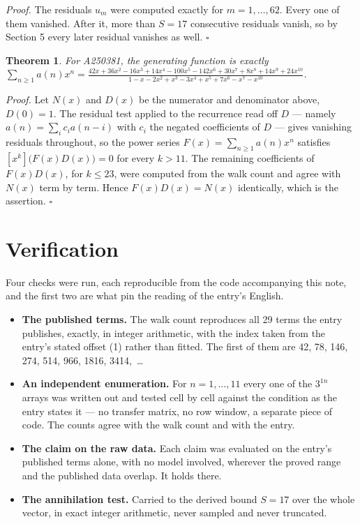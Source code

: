 \documentclass[11pt]{article}
\newtheorem{theorem}{Theorem}
\theoremstyle{definition}
\begin{document}
{\itshape Proof.} The residuals $u_m$ were computed exactly for $m = 1,\dots,62$. Every one of them vanished. After it, more than $S = 17$ consecutive residuals vanish, so by Section 5 every later residual vanishes as well. $\square$

\begin{theorem} For A250381, the generating function is exactly $\sum_{n\ge 1} a(n)x^n = \frac{42x + 36x^{2} - 16x^{3} + 14x^{4} - 100x^{5} - 142x^{6} + 30x^{7} + 8x^{8} + 14x^{9} + 24x^{10}}{1 - x - 2x^{2} + x^{3} - 3x^{4} + x^{5} + 7x^{6} - x^{7} - x^{10}}$.\end{theorem}

{\itshape Proof.} Let $N(x)$ and $D(x)$ be the numerator and denominator above, $D(0)=1$. The residual test applied to the recurrence read off $D$ --- namely $a(n) = \sum_i c_i a(n-i)$ with $c_i$ the negated coefficients of $D$ --- gives vanishing residuals throughout, so the power series $F(x)=\sum_{n\ge 1}a(n)x^n$ satisfies $[x^k]\bigl(F(x)D(x)\bigr) = 0$ for every $k > 11$. The remaining coefficients of $F(x)D(x)$, for $k \le 23$, were computed from the walk count and agree with $N(x)$ term by term. Hence $F(x)D(x) = N(x)$ identically, which is the assertion. $\square$

\section{Verification}

Four checks were run, each reproducible from the code accompanying this note, and the first two are what pin the reading of the entry's English.

\begin{itemize}

\item {\bfseries The published terms.} The walk count reproduces all 29 terms the entry publishes, exactly, in integer arithmetic, with the index taken from the entry's stated offset (1) rather than fitted. The first of them are 42, 78, 146, 274, 514, 966, 1816, 3414,~\dots

\item {\bfseries An independent enumeration.} For $n = 1,\dots,11$ every one of the $3^{1n}$ arrays was written out and tested cell by cell against the condition as the entry states it --- no transfer matrix, no row window, a separate piece of code. The counts agree with the walk count and with the entry.

\item {\bfseries The claim on the raw data.} Each claim was evaluated on the entry's published terms alone, with no model involved, wherever the proved range and the published data overlap. It holds there.

\item {\bfseries The annihilation test.} Carried to the derived bound $S = 17$ over the whole vector, in exact integer arithmetic, never sampled and never truncated.

\end{itemize}
\end{document}
